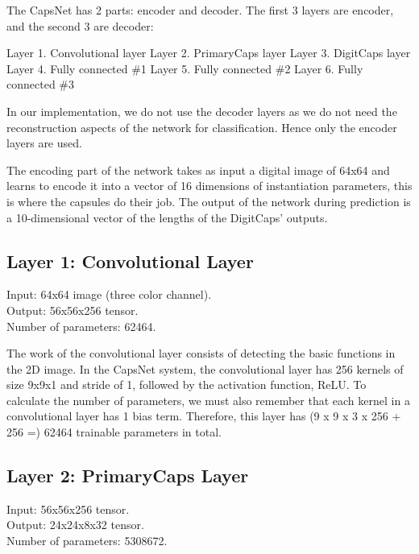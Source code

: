 \par\bigskip
The CapsNet has 2 parts: encoder and decoder. The first 3 layers are encoder, and the second 3 are decoder:

Layer 1. Convolutional layer
Layer 2. PrimaryCaps layer
Layer 3. DigitCaps layer
Layer 4. Fully connected \#1
Layer 5. Fully connected \#2
Layer 6. Fully connected \#3

In our implementation, we do not use the decoder layers as we do not need the reconstruction aspects of the network for classification. Hence only the encoder layers are used.
\par\bigskip
The encoding part of the network takes as input a digital image of 64x64 and learns to encode it into a vector of 16 dimensions of instantiation parameters, this is where the capsules do their job. The output of the network during prediction is a 10-dimensional vector of the lengths of the DigitCaps' outputs.


\subsection{Layer 1: Convolutional Layer} %
\label{sub:layer_1_convolutional_layer}
\noindent Input: 64x64 image (three color channel).
\\Output: 56x56x256 tensor.
\\Number of parameters: 62464.

\par\bigskip The work of the convolutional layer consists of detecting the basic functions in the 2D image. In the CapsNet system, the convolutional layer has 256 kernels of size 9x9x1 and stride of 1, followed by the activation function, ReLU. To calculate the number of parameters, we must also remember that each kernel in a convolutional layer has 1 bias term. Therefore, this layer has (9 x 9 x 3 x 256 + 256 =) 62464 trainable parameters in total.


\subsection{Layer 2: PrimaryCaps Layer} %
\label{sub:layer_2_primarycaps_layer}
\noindent Input: 56x56x256 tensor.
\\Output: 24x24x8x32 tensor.
\\Number of parameters: 5308672.

